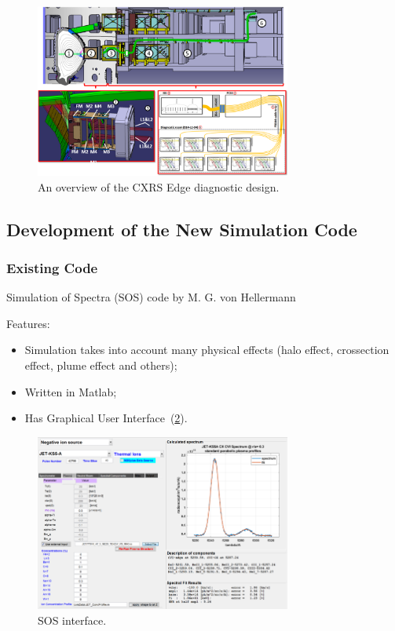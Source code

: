 \documentclass[../main.tex]{subfiles}
\begin{document}
\begin{figure}[htbp]
    \centering
    \includegraphics[width=0.75\textwidth]{images/cxrs_edge_overview}
    \caption{An overview of the CXRS Edge diagnostic design.}%
    \label{fig:cxrs_edge_overview}
\end{figure}

\subsection{Development of the New Simulation Code}
\subsubsection{Existing Code}
Simulation of Spectra (SOS) code by M. G. von Hellermann~\cite{sos}

Features:
\begin{itemize}
    \item Simulation takes into account many physical effects (halo effect, crossection effect, plume effect and others);
    \item Written in Matlab;
    \item Has Graphical User Interface~(\cref{fig:sos_interface}).
\end{itemize}

\begin{figure}[!ht]
    \centering
    \includegraphics[width=0.75\textwidth]{images/sos_interface}
    \caption{SOS interface.}%
    \label{fig:sos_interface}
\end{figure}
\end{document}
